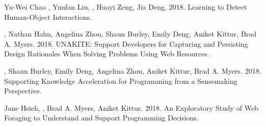 

\begin{cvpubs}
{Yu-Wei Chao , Yunfan Liu, , Huayi Zeng, Jia Deng. 2018. Learning to Detect Human-Object Interactions. } %
\end{cvpubs}


\begin{cvpubs}
{, Nathan Hahn, Angelina Zhou, Shaun Burley, Emily Deng, Aniket Kittur, Brad A. Myers. 2018. UNAKITE: Support Developers for Capturing and Persisting Design Rationales When Solving Problems Using Web Resources. } %

{, Shaun Burley, Emily Deng, Angelina Zhou, Aniket Kittur, Brad A. Myers. 2018. Supporting Knowledge Acceleration for Programming from a Sensemaking Perspective. } %
\end{cvpubs}



\begin{cvpubs}
{Jane Hsieh, , Brad A. Myers, Aniket Kittur. 2018. An Exploratory Study of Web Foraging to Understand and Support Programming Decisions. } %
\end{cvpubs}
